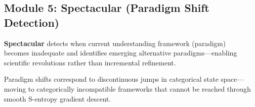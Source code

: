 \subsection{Module 5: Spectacular (Paradigm Shift Detection)}

\begin{definition}
\textbf{Spectacular} detects when current understanding framework (paradigm) becomes inadequate and identifies emerging alternative paradigms—enabling scientific revolutions rather than incremental refinement.
\end{definition}

\begin{theorem}
Paradigm shifts correspond to discontinuous jumps in categorical state space—moving to categorically incompatible frameworks that cannot be reached through smooth S-entropy gradient descent.
\end{theorem}

